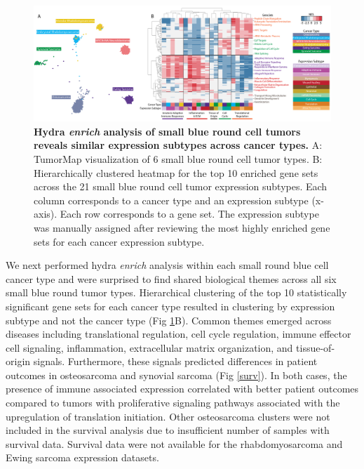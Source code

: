\documentclass[10pt,letterpaper]{article}
\begin{document}
\begin{figure}[!h]
	\includegraphics[width=\textwidth]{img/PNG/hydra-pan-small-round-blue-V2-2x}
	\caption{{\bf Hydra \textit{enrich} analysis of small blue round cell tumors reveals similar expression subtypes across cancer types.} A: TumorMap visualization of 6 small blue round cell tumor types. B: Hierarchically clustered heatmap for the top 10 enriched gene sets across the 21 small blue round cell tumor expression subtypes. Each column corresponds to a cancer type and an expression subtype (x-axis). Each row corresponds to a gene set. The expression subtype was manually assigned after reviewing the most highly enriched gene sets for each cancer expression subtype.}
	\label{pancan}
\end{figure}

We next performed hydra \textit{enrich} analysis within each small round blue cell cancer type and were surprised to find shared biological themes across all six small blue round tumor types. Hierarchical clustering of the top 10 statistically significant gene sets for each cancer type resulted in clustering by expression subtype and not the cancer type (Fig \ref{pancan}B). Common themes emerged across diseases including translational regulation, cell cycle regulation, immune effector cell signaling, inflammation, extracellular matrix organization, and tissue-of-origin signals. Furthermore, these signals predicted differences in patient outcomes in osteosarcoma and synovial sarcoma (Fig \ref{surv}). In both cases, the presence of immune associated expression correlated with better patient outcomes compared to tumors with proliferative signaling pathways associated with the upregulation of translation initiation. Other osteosarcoma clusters were not included in the survival analysis due to insufficient number of samples with survival data. Survival data were not available for the rhabdomyosarcoma and Ewing sarcoma expression datasets.

%
%
\end{document}
